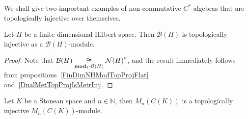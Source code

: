 We shall give two important examples of non-commutative $C^*$-algebras that are
topologically injective over themselves.

\begin{proposition}\label{FinDimBHModTopInj} Let $H$ be a finite dimensional
Hilbert space. Then $\mathcal{B}(H)$ is topologically injective as a
$\mathcal{B}(H)$-module. 
\end{proposition}
\begin{proof} Note that
$\mathcal{B}(H)\mathrel{\mathop{\cong}\limits_{\mathbf{mod}_1\text{-}\mathcal{B}(H)}}{\mathcal{N}(H)}^*$, and
the result immediately follows from propositions~\ref{FinDimNHModTopProjFlat}
and~\ref{DualMetTopProjIsMetrInj}.
\end{proof}

\begin{proposition}\label{CKMatrixModTopInj} Let $K$ be a Stonean space and
$n\in\mathbb{N}$, then $M_n(C(K))$ is a topologically injective
$M_n(C(K))$-module.
\end{proposition}
